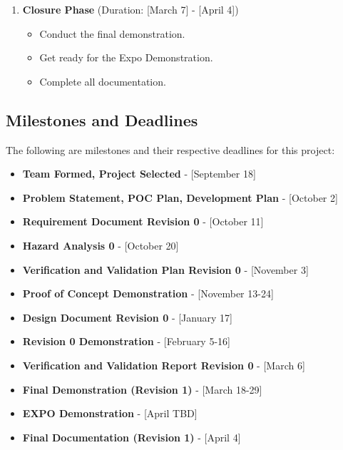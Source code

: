 \documentclass{article}
\begin{document}
\begin{enumerate}
  \item \textbf{Closure Phase} (Duration: [March 7] - [April 4])
  \begin{itemize}
    \item Conduct the final demonstration.
    \item Get ready for the Expo Demonstration.
    \item Complete all documentation.
  \end{itemize}
\end{enumerate}


\subsection{Milestones and Deadlines}

The following are milestones and their respective deadlines for this project:

\begin{itemize}
  \item \textbf{Team Formed, Project Selected} - [September 18]
  \item \textbf{Problem Statement, POC Plan, Development Plan} - [October 2]
  \item \textbf{Requirement Document  Revision 0} - [October 11]
  \item \textbf{Hazard Analysis 0} - [October 20]
  \item \textbf{Verification and Validation Plan Revision 0} - [November 3]
  \item \textbf{Proof of Concept Demonstration} - [November 13-24]
  \item \textbf{Design Document Revision 0} - [January 17]
  \item \textbf{Revision 0 Demonstration} - [February 5-16]
  \item \textbf{Verification and Validation Report Revision 0} - [March 6]
  \item \textbf{Final Demonstration (Revision 1)} - [March 18-29]
  \item \textbf{EXPO Demonstration} - [April TBD]
  \item \textbf{Final Documentation (Revision 1)} - [April 4]
\end{itemize}
\end{document}
